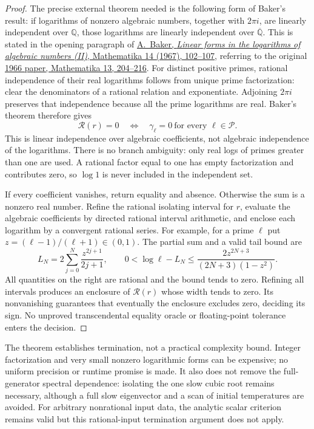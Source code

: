 \documentclass[11pt]{article}
\begin{document}
\begin{proof}
The precise external theorem needed is the following form of Baker's result:
if logarithms of nonzero algebraic numbers, together with $2\pi i$, are
linearly independent over $\mathbb Q$, those logarithms are linearly
independent over $\overline{\mathbb Q}$.
This is stated in the opening paragraph of
\href{https://doi.org/10.1112/S0025579300008068}{A.~Baker,
\emph{Linear forms in the logarithms of algebraic numbers (II)},
Mathematika 14 (1967), 102--107}, referring to the original
\href{https://doi.org/10.1112/S0025579300003971}{1966 paper,
Mathematika 13, 204--216}.
For distinct positive primes, rational independence of their real logarithms
follows from unique prime factorization: clear the denominators of a rational
relation and exponentiate. Adjoining $2\pi i$ preserves that independence
because all the prime logarithms are real. Baker's theorem therefore gives
\[
\mathcal R(r)=0\quad\Longleftrightarrow\quad
\gamma_\ell=0\ \text{for every }\ell\in\mathcal P.
\]
This is linear independence over algebraic coefficients, not algebraic
independence of the logarithms. There is no branch ambiguity: only real
logs of primes greater than one are used. A rational factor equal to one
has empty factorization and contributes zero, so $\log1$ is never included
in the independent set.

If every coefficient vanishes, return equality and absence. Otherwise the
sum is a nonzero real number. Refine the rational isolating interval for
$r$, evaluate the algebraic coefficients by directed rational interval
arithmetic, and enclose each logarithm by a convergent rational series.
For example, for a prime $\ell$ put $z=(\ell-1)/(\ell+1)\in(0,1)$.
The partial sum and a valid tail bound are
\[
L_N=2\sum_{j=0}^{N}\frac{z^{2j+1}}{2j+1},\qquad
0<\log\ell-L_N\leq
\frac{2z^{2N+3}}{(2N+3)(1-z^2)}.
\]
All quantities on the right are rational and the bound tends to zero.
Refining all intervals produces an enclosure of $\mathcal R(r)$ whose
width tends to zero. Its nonvanishing guarantees that eventually the
enclosure excludes zero, deciding its sign. No unproved transcendental
equality oracle or floating-point tolerance enters the decision.
\end{proof}

The theorem establishes termination, not a practical complexity bound.
Integer factorization and very small nonzero logarithmic forms can be
expensive; no uniform precision or runtime promise is made. It also does
not remove the full-generator spectral dependence: isolating the one slow
cubic root remains necessary, although a full slow eigenvector and a scan
of initial temperatures are avoided. For arbitrary nonrational input data,
the analytic scalar criterion remains valid but this rational-input
termination argument does not apply.
\end{document}

